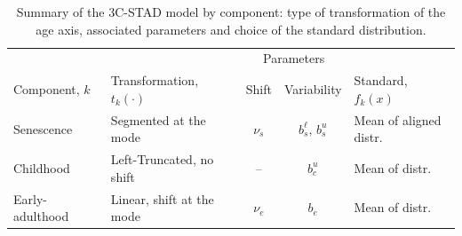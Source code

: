 \documentclass[11pt, a4paper]{article}
\begin{document}
\begin{table}[t]
	\centering
	\begin{tabular}{l|l|c|c|l}
		\multicolumn{1}{c|}{}                                & \multicolumn{1}{c|}{}                                                 & \multicolumn{2}{c|}{Parameters}         & \multicolumn{1}{c}{}                                  \\
		\multicolumn{1}{l|}{\multirow{-2}{*}{Component, $k$}} & \multicolumn{1}{l|}{\multirow{-2}{*}{Transformation, $t_{k}(\cdot)$}} & Shift     & Variability & \multicolumn{1}{l}{\multirow{-2}{*}{Standard, $f_{k}(x)$}} \\ \midrule 
		\rowcolor{my-grey}  
		Senescence                                           & Segmented at the mode                                                 & $\nu_{s}$ & $b_{s}^{\ell},\,b_{s}^{u}$  & Mean of aligned distr.                                \\
		Childhood                                            & Left-Truncated, no shift                                              & --        & $b_{c}^{u}$                 & Mean of distr.                                        \\
		\rowcolor{my-grey} 
		Early-adulthood $\;$                                          & Linear, shift at the mode $\;$                                            & $\nu_{e}$ & $b_{e}$                     & Mean of distr.       \\ 
		
		\bottomrule                                  
	\end{tabular}
	\caption{Summary of the 3C-STAD model by component: type of transformation of the age axis, associated parameters and choice of the standard distribution.}\label{Table:Model}
\end{table}
\end{document}

